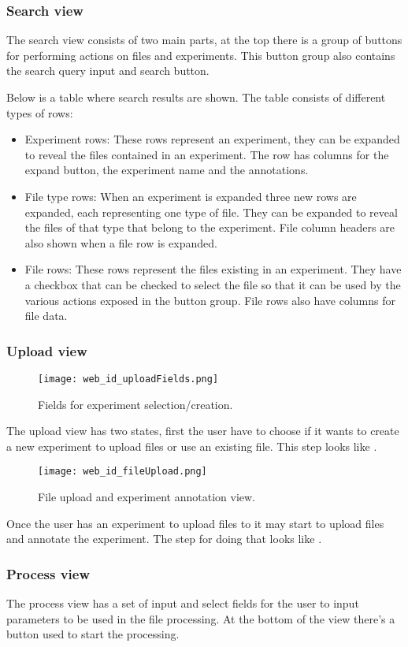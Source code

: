 \subsubsection{Search view}
The search view consists of two main parts, at the top there is a group of buttons for performing actions on files and experiments. This button group also contains the search query input and search button.

Below is a table where search results are shown. The table consists of different types of rows:

\begin{itemize}
	\item Experiment rows: These rows represent an experiment, they can be expanded to reveal the files contained in an experiment. The row has columns for the expand button, the experiment name and the annotations.
	\item File type rows: When an experiment is expanded three new rows are expanded, each representing one type of file. They can be expanded to reveal the files of that type that belong to the experiment. File column headers are also shown when a file row is expanded.
	\item File rows: These rows represent the files existing in an experiment. They have a checkbox that can be checked to select the file so that it can be used by the various actions exposed in the button group. File rows also have columns for file data.
\end{itemize}

\subsubsection{Upload view}
\begin{figure}[h]
\centering
\texttt{[image: web\_id\_uploadFields.png]}
\caption{\label{fig:web_id_uploadFields}Fields for experiment selection/creation.}
\end{figure}

The upload view has two states, first the user have to choose if it wants to create a new experiment to upload files or use an existing file. This step looks like .

\begin{figure}[h]
\centering
\texttt{[image: web\_id\_fileUpload.png]}
\caption{\label{fig:web_id_fileUpload}File upload and experiment annotation view.}
\end{figure}

Once the user has an experiment to upload files to it may start to upload files and annotate the experiment. The step for doing that looks like .

\subsubsection{Process view}
The process view has a set of input and select fields for the user to input parameters to be used in the file processing. At the bottom of the view there’s a button used to start the processing.
